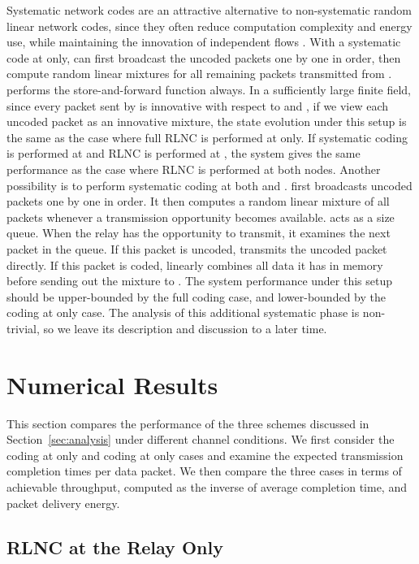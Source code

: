 \documentclass[journal, letterpaper]{IEEEtran}
\begin{document}
\begin{itemize}
Systematic network codes are an attractive alternative to non-systematic random linear network codes, since they often reduce computation complexity and energy use, while maintaining the innovation of independent flows \cite{lucani2010systematic}. With a systematic code at  only,  can first broadcast the uncoded packets one by one in order, then compute random linear mixtures for all remaining packets transmitted from .  performs the store-and-forward function always. In a sufficiently large finite field, since every packet sent by  is innovative with respect to  and , if we view each uncoded packet as an innovative mixture, the state evolution under this setup is the same as the case where full RLNC is performed at  only. If systematic coding is performed at  and RLNC is performed at , the system gives the same performance as the case where RLNC is performed at both nodes. Another possibility is to perform systematic coding at both  and .  first broadcasts uncoded packets one by one in order. It then computes a random linear mixture of all  packets whenever a transmission opportunity becomes available.  acts as a size  queue. When the relay has the opportunity to transmit, it examines the next packet in the queue. If this packet is uncoded,  transmits the uncoded packet directly. If this packet is coded,  linearly combines all data it has in memory before sending out the mixture to . The system performance under this setup should be upper-bounded by the full coding case, and lower-bounded by the coding at  only case. The analysis of this additional systematic phase is non-trivial, so we leave its description and discussion to a later time.



\section{Numerical Results}\label{sec:simulations}

This section compares the performance of the three schemes discussed in Section~\ref{sec:analysis} under different channel conditions. We first consider the coding at  only and coding at  only cases and examine the expected transmission completion times per data packet. We then compare the three cases in terms of achievable throughput, computed as the inverse of average completion time, and packet delivery energy.

\subsection{RLNC at the Relay  Only}


\end{itemize}
\end{document}
